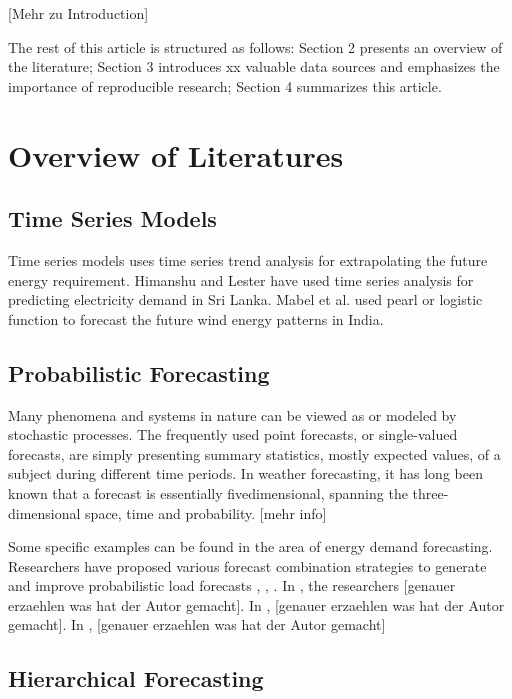 \documentclass[lettersize,journal]{IEEEtran}
\begin{document}
[Mehr zu Introduction]

The rest of this article is structured as follows: Section 2 presents an overview of the literature; Section 3 introduces xx valuable data sources and emphasizes the importance of reproducible research; Section 4 summarizes this article.

\section{Overview of Literatures}

  \subsection{Time Series Models}
Time series models uses time series trend analysis for extrapolating the future energy requirement. Himanshu and Lester \cite{srilanka} have used time series analysis for predicting electricity demand in Sri Lanka. Mabel et al. used pearl or logistic function to forecast the future wind energy patterns in India\cite{TSA-india}.
  
  \subsection{Probabilistic Forecasting}
  Many phenomena and systems in nature can be viewed as or modeled by stochastic processes. The frequently used point forecasts, or single-valued forecasts, are simply presenting summary statistics, mostly expected values, of a subject during different time periods. In weather forecasting, it has long been known that a forecast is essentially fivedimensional, spanning the three-dimensional space, time and probability. [mehr info] 

  Some specific examples can be found in the area of energy demand forecasting. Researchers have proposed various forecast combination strategies to generate and improve probabilistic load forecasts \cite{37}, \cite{76}, \cite{77}. In \cite{37}, the researchers [genauer erzaehlen was hat der Autor gemacht]. In \cite{76}, [genauer erzaehlen was hat der Autor gemacht]. In \cite{77}, [genauer erzaehlen was hat der Autor gemacht]

  \subsection{Hierarchical Forecasting}
  
\end{document}
